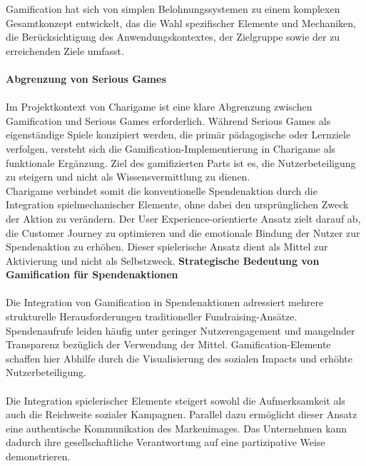 Gamification hat sich von simplen Belohnungssystemen zu einem komplexen Gesamtkonzept entwickelt, das die Wahl spezifischer Elemente und Mechaniken, die Berücksichtigung des Anwendungskontextes, der Zielgruppe sowie der zu erreichenden Ziele umfasst. \cite{bpb2023gamification}
\\\\
\textbf{Abgrenzung von Serious Games}\\\\
Im Projektkontext von Charigame ist eine klare Abgrenzung zwischen Gamification und Serious Games erforderlich.
Während Serious Games als eigenständige Spiele konzipiert werden, die primär pädagogische oder Lernziele verfolgen, versteht sich die Gamification-Implementierung in Charigame als funktionale Ergänzung.
Ziel des gamifizierten Parts ist es, die Nutzerbeteiligung zu steigern und nicht als Wissensvermittlung zu dienen.
\\
Charigame verbindet somit die konventionelle Spendenaktion durch die Integration spielmechanischer Elemente, ohne dabei den ursprünglichen Zweck der Aktion zu verändern.
Der User Experience-orientierte Ansatz zielt darauf ab, die Customer Journey zu optimieren und die emotionale Bindung der Nutzer zur Spendenaktion zu erhöhen.
Dieser spielerische Ansatz dient als Mittel zur Aktivierung und nicht als Selbstzweck.
\newpage
\textbf{Strategische Bedeutung von Gamification für Spendenaktionen}
\\\\
Die Integration von Gamification in Spendenaktionen adressiert mehrere strukturelle Herausforderungen traditioneller Fundraising-Ansätze.
Spendenaufrufe leiden häufig unter geringer Nutzerengagement und mangelnder Transparenz bezüglich der Verwendung der Mittel.
Gamification-Elemente schaffen hier Abhilfe durch die Visualisierung des sozialen Impacts und erhöhte Nutzerbeteiligung. \cite{golrang2021applying}
\\\\
Die Integration spielerischer Elemente steigert sowohl die Aufmerksamkeit als auch die Reichweite sozialer Kampagnen.
Parallel dazu ermöglicht dieser Ansatz eine authentische Kommunikation des Markenimages.
Das Unternehmen kann dadurch ihre gesellschaftliche Verantwortung auf eine partizipative Weise demonstrieren.

